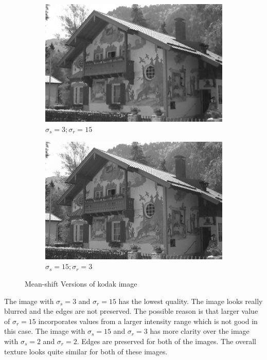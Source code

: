 \documentclass[12pt]{article}
\begin{document}
\begin{figure}[h]
    \begin{subfigure}[b]{0.24\textwidth}
        \centering
        \includegraphics[width=\textwidth]{../images/filtered_kodak24_meanshift_sigma_s_3_sigma_r_15.png}
        \caption{$\sigma_s=3;\sigma_r=15$}
        \label{fig:subfig3}
    \end{subfigure}
    \begin{subfigure}[b]{0.24\textwidth}
        \centering
        \includegraphics[width=\textwidth]{../images/filtered_kodak24_meanshift_sigma_s_15_sigma_r_3.png}
        \caption{$\sigma_s=15;\sigma_r=3$}
        \label{fig:subfig3}
    \end{subfigure}
    
    \caption{Mean-shift Versions of kodak image}
    \label{fig:overall}
\end{figure}

The image with $\sigma_s=3$ and $\sigma_r=15$ has the lowest quality. The image looks really blurred and the edges are not preserved. The possible reason is that larger value of $\sigma_r=15$ incorporates values from a larger intensity range which is not good in this case. The image with $\sigma_s=15$ and $\sigma_r=3$ has more clarity over the image with $\sigma_s=2$ and $\sigma_r=2$. Edges are preserved for both of the images. The overall texture looks quite similar for both of these images.
\end{document}
